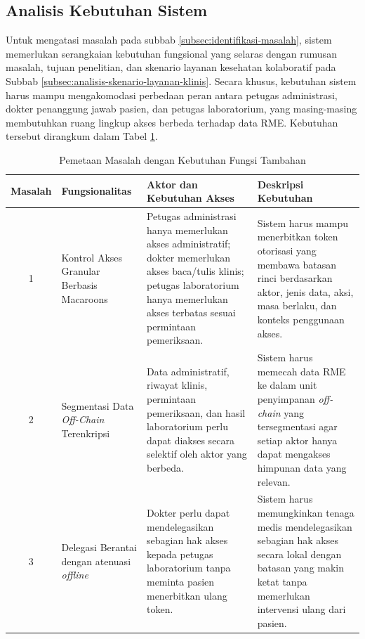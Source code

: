 \subsection{Analisis Kebutuhan Sistem}
\label{subsec:analisis-kebutuhan-sistem}
Untuk mengatasi masalah pada subbab \ref{subsec:identifikasi-masalah}, sistem memerlukan serangkaian kebutuhan fungsional yang selaras dengan rumusan masalah, tujuan penelitian, dan skenario layanan kesehatan kolaboratif pada Subbab \ref{subsec:analisis-skenario-layanan-klinis}. Secara khusus, kebutuhan sistem harus mampu mengakomodasi perbedaan peran antara petugas administrasi, dokter penanggung jawab pasien, dan petugas laboratorium, yang masing-masing membutuhkan ruang lingkup akses berbeda terhadap data RME. Kebutuhan tersebut dirangkum dalam Tabel \ref{tab:kebutuhan-fungsional-tambahan}.

\begin{table}[!ht]
	\centering
	\caption{Pemetaan Masalah dengan Kebutuhan Fungsi Tambahan}
	\label{tab:kebutuhan-fungsional-tambahan}
	\small
	\begin{tabular}{|c|p{}|p{}|p{}|}
		\hline
		\textbf{Masalah} & \textbf{Fungsionalitas}                            & \textbf{Aktor dan Kebutuhan Akses}                                                                                                                                                        & \textbf{Deskripsi Kebutuhan}                                                                                                                                         \\ \hline
		1                & Kontrol Akses Granular Berbasis Macaroons          & Petugas administrasi hanya memerlukan akses administratif; dokter memerlukan akses baca/tulis klinis; petugas laboratorium hanya memerlukan akses terbatas sesuai permintaan pemeriksaan. & Sistem harus mampu menerbitkan token otorisasi yang membawa batasan rinci berdasarkan aktor, jenis data, aksi, masa berlaku, dan konteks penggunaan akses.           \\ \hline
		2                & Segmentasi Data \textit{Off-Chain} Terenkripsi     & Data administratif, riwayat klinis, permintaan pemeriksaan, dan hasil laboratorium perlu dapat diakses secara selektif oleh aktor yang berbeda.                                           & Sistem harus memecah data RME ke dalam unit penyimpanan \textit{off-chain} yang tersegmentasi agar setiap aktor hanya dapat mengakses himpunan data yang relevan.    \\ \hline
		3                & Delegasi Berantai dengan atenuasi \textit{offline} & Dokter perlu dapat mendelegasikan sebagian hak akses kepada petugas laboratorium tanpa meminta pasien menerbitkan ulang token.                                                            & Sistem harus memungkinkan tenaga medis mendelegasikan sebagian hak akses secara lokal dengan batasan yang makin ketat tanpa memerlukan intervensi ulang dari pasien. \\ \hline
	\end{tabular}
\end{table}

